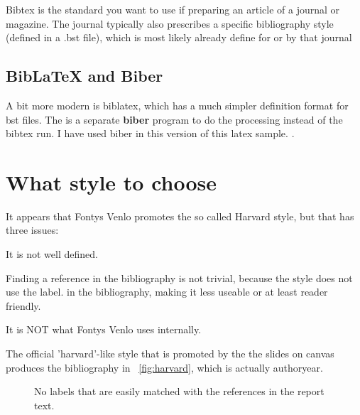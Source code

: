Bibtex is the standard you want to use if preparing an article of a
journal or magazine. The journal typically also prescribes a specific
bibliography style (defined in a .bst file), which is most likely
already define for or by that journal

\subsection{BibLaTeX and Biber}

A bit more modern is biblatex, which has a much simpler definition
format for bst files. The is a separate \textbf{biber} program to do
the processing instead of the bibtex run.
I have used biber in this version of this latex sample. \parencite{biblatexsite}.

\section{What style to choose}

It appears that Fontys Venlo promotes the so called Harvard style, but that has three issues:
\begin{Enumerate}
\item It is not well defined.
\item Finding a reference in the bibliography is not trivial, because the style does not use the label.
  in the bibliography, making it less useable or at least reader friendly.
\item It is NOT what Fontys Venlo uses internally.
\end{Enumerate}


The official 'harvard'-like style that is promoted by the the slides on canvas
produces the bibliography in ~\vref{fig:harvard}, which is actually authoryear.

\begin{figure}
  \caption{\label{fig:harvard}No labels that are easily matched with the references in the report text.}
\end{figure}

